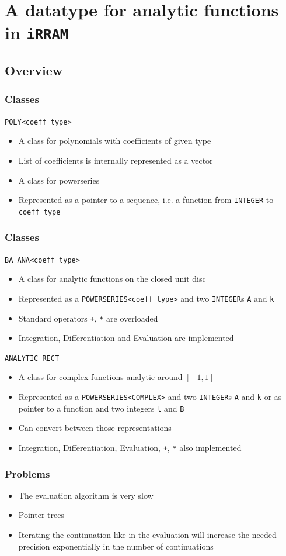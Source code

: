\documentclass[xcolor=pdftex,dvipsnames,table]{beamer}
\newcommand{\irram}{\texttt{iRRAM}\xspace}
\newcommand{\code}[1]{\texttt{#1}}
\begin{document}
\section[{Analytic functions in \irram}]{A datatype for analytic functions in \irram}
\subsection{Overview}
\begin{frame}
\frametitle{Classes}
\code{POLY<coeff\_type>}
\begin{itemize}
\item<1-> A class for polynomials with coefficients of given type
\item<2-> List of coefficients is internally represented as a vector
\end{itemize}
 \onslide<3->{
\code{POWERSERIES<coeff\_type>}
}
\begin{itemize}
\item<3-> A class for powerseries
\item<4-> Represented as a pointer to a sequence, i.e. a function from \code{INTEGER} to \code{coeff\_type}
\end{itemize}
\end{frame}
\begin{frame}[<+->]
\frametitle{Classes}
\code{BA\_ANA<coeff\_type>}
\begin{itemize}
\item A class for analytic functions on the closed unit disc
\item Represented as a \code{POWERSERIES<coeff\_type>} and two \code{INTEGER}s \code{A} and \code{k}
\item Standard operators \code{+}, \code{*} are overloaded
\item Integration, Differentiation and Evaluation are implemented
\end{itemize}
\pause
\code{ANALYTIC\_RECT}
\begin{itemize}
\item A class for complex functions analytic around $[-1,1]$
\item Represented as a \code{POWERSERIES<COMPLEX>} and two \code{INTEGER}s \code{A} and \code{k} or as pointer to a function and two integers \code{l} and \code{B}
\item Can convert between those representations
\item Integration, Differentiation, Evaluation, \code{+}, \code{*} also implemented  
\end{itemize}
\end{frame}
\begin{frame}[<+->]
\frametitle{Problems}
\begin{itemize}
\item The evaluation algorithm is very slow
\item Pointer trees
\item Iterating the continuation like in the evaluation will increase the needed precision exponentially in the number of continuations
\end{itemize}
\end{frame}
\end{document}
